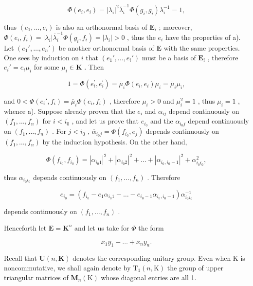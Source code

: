 \[
\Phi (e _ {i}, e _ {i}) = | \lambda_ {i} | ^ {2} \overline {{{{\lambda}}}} _ {i} ^ {- 1} \Phi (g _ {i}, g _ {i}) \lambda_ {i} ^ {- 1} = 1,
\]

thus \((e_1, \ldots, e_i)\) is also an orthonormal basis of \(\mathbf{E}_i\) ; moreover, \(\Phi(e_i, f_i) = |\lambda_i| \overline{\lambda}_i^{-1} \Phi(g_i, f_i) = |\lambda_i| > 0\) , thus the \(e_i\) have the properties of a). Let \((e_1', \ldots, e_n')\) be another orthonormal basis of \(\mathbf{E}\) with the same properties. One sees by induction on \(i\) that \((e_1', \ldots, e_i')\) must be a basis of \(\mathbf{E}_i\) , therefore \(e_i' = e_i \mu_i\) for some \(\mu_i \in \mathbf{K}\) . Then

\[
1 = \Phi (e _ {i} ^ {\prime}, e _ {i} ^ {\prime}) = \overline {{\mu}} _ {i} \Phi (e _ {i}, e _ {i}) \mu_ {i} = \overline {{\mu}} _ {i} \mu_ {i},
\]

and \(0 < \Phi(e_i', f_i) = \overline{\mu}_i \Phi(e_i, f_i)\) , therefore \(\mu_i > 0\) and \(\mu_i^2 = 1\) , thus \(\mu_i = 1\) , whence a). Suppose already proven that the \(e_i\) and \(\alpha_{ij}\) depend continuously on \((f_1, \ldots, f_n)\) for \(i < i_0\) , and let us prove that \(e_{i_0}\) and the \(\alpha_{i_0j}\) depend continuously on \((f_1, \ldots, f_n)\) . For \(j < i_0\) , \(\overline{\alpha}_{i_0j} = \Phi(f_{i_0}, e_j)\) depends continuously on \((f_1, \ldots, f_n)\) by the induction hypothesis. On the other hand,

\[
\Phi (f _ {i _ {0}}, f _ {i _ {0}}) = | \alpha_ {i _ {0} 1} | ^ {2} + | \alpha_ {i _ {0} 2} | ^ {2} + \dots + | \alpha_ {i _ {0}, i _ {0} - 1} | ^ {2} + \alpha_ {i _ {0} i _ {0}} ^ {2},
\]

thus \(\alpha_{i_0i_0}\) depends continuously on \((f_1,\ldots ,f_n)\) . Therefore

\[
e _ {i _ {0}} = (f _ {i _ {0}} - e _ {1} \alpha_ {i _ {0} 1} - \dots - e _ {i _ {0} - 1} \alpha_ {i _ {0}, i _ {0} - 1}) \alpha_ {i _ {0} i _ {0}} ^ {- 1}
\]

depends continuously on \((f_1, \ldots, f_n)\) .

Henceforth let \(\mathbf{E} = \mathbf{K}^n\) and let us take for \(\Phi\) the form

\[
\overline {{{x}}} _ {1} y _ {1} + \dots + \overline {{{x}}} _ {n} y _ {n}.
\]

Recall that \(\mathbf{U}(n,\mathbf{K})\) denotes the corresponding unitary group. Even when K is noncommutative, we shall again denote by \(\mathrm{T}_{1}(n,\mathrm{K})\) the group of upper triangular matrices of \(\mathbf{M}_{n}(\mathrm{K})\) whose diagonal entries are all 1.

